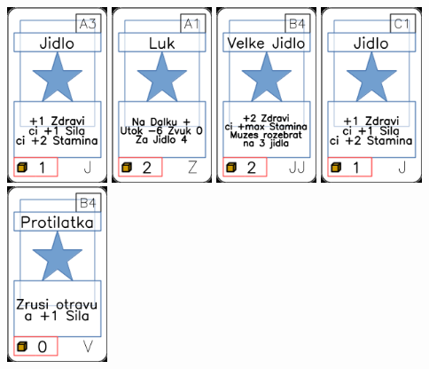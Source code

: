 \documentclass[a4paper]{article}
\begin{document}
	\includegraphics[width=3.0cm]{img-1_2}
	\includegraphics[width=3.0cm]{img-1_90}
	\includegraphics[width=3.0cm]{img-1_38}
	\includegraphics[width=3.0cm]{img-1_10}
	\includegraphics[width=3.0cm]{img-1_68}
\end{document}
